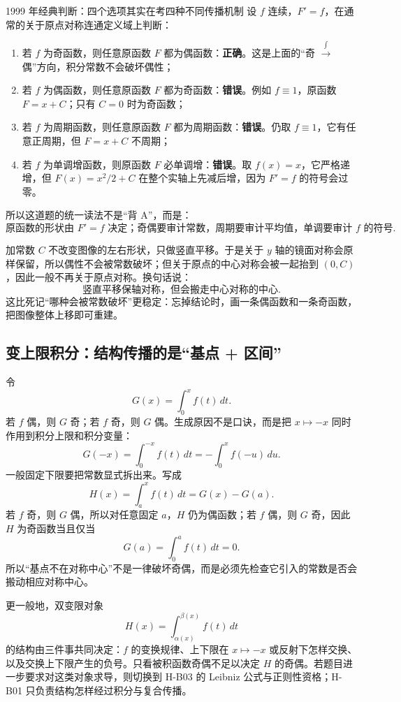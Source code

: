 \documentclass[11pt,a4paper]{ctexart}
\begin{document}
\begin{corebox}{1999 年经典判断：四个选项其实在考四种不同传播机制}
设 $f$ 连续，$F'=f$，在通常的关于原点对称连通定义域上判断：
\begin{enumerate}
\item 若 $f$ 为奇函数，则任意原函数 $F$ 都为偶函数：\textbf{正确}。这是上面的“奇 $\xrightarrow{\int}$ 偶”方向，积分常数不会破坏偶性；
\item 若 $f$ 为偶函数，则任意原函数 $F$ 都为奇函数：\textbf{错误}。例如 $f\equiv1$，原函数 $F=x+C$；只有 $C=0$ 时为奇函数；
\item 若 $f$ 为周期函数，则任意原函数 $F$ 都为周期函数：\textbf{错误}。仍取 $f\equiv1$，它有任意正周期，但 $F=x+C$ 不周期；
\item 若 $f$ 为单调增函数，则原函数 $F$ 必单调增：\textbf{错误}。取 $f(x)=x$，它严格递增，但 $F(x)=x^2/2+C$ 在整个实轴上先减后增，因为 $F'=f$ 的符号会过零。
\end{enumerate}

所以这道题的统一读法不是“背 A”，而是：
\[
\boxed{\text{原函数的形状由 }F'=f\text{ 决定；奇偶要审计常数，周期要审计平均值，单调要审计 }f\text{ 的符号}.}
\]
\end{corebox}

\begin{tcolorbox}[title=直觉锚点：积分常数只是把整张图上下平移]
加常数 $C$ 不改变图像的左右形状，只做竖直平移。于是关于 $y$ 轴的镜面对称会原样保留，所以偶性不会被常数破坏；但关于原点的中心对称会被一起抬到 $(0,C)$，因此一般不再关于原点对称。换句话说：
\[
\boxed{\text{竖直平移保轴对称，但会搬走中心对称的中心}.}
\]
这比死记“哪种会被常数破坏”更稳定：忘掉结论时，画一条偶函数和一条奇函数，把图像整体上移即可重建。
\end{tcolorbox}

\subsection{变上限积分：结构传播的是“基点 + 区间”}
令
\[
G(x)=\int_0^x f(t)\,dt.
\]
若 $f$ 偶，则 $G$ 奇；若 $f$ 奇，则 $G$ 偶。生成原因不是口诀，而是把 $x\mapsto -x$ 同时作用到积分上限和积分变量：
\[
G(-x)=\int_0^{-x}f(t)\,dt=-\int_0^x f(-u)\,du.
\]
一般固定下限要把常数显式拆出来。写成
\[
H(x)=\int_a^x f(t)\,dt=G(x)-G(a).
\]
若 $f$ 奇，则 $G$ 偶，所以对任意固定 $a$，$H$ 仍为偶函数；若 $f$ 偶，则 $G$ 奇，因此 $H$ 为奇函数当且仅当
\[
G(a)=\int_0^a f(t)\,dt=0.
\]
所以“基点不在对称中心”不是一律破坏奇偶，而是必须先检查它引入的常数是否会搬动相应对称中心。

更一般地，双变限对象
\[
H(x)=\int_{\alpha(x)}^{\beta(x)}f(t)\,dt
\]
的结构由三件事共同决定：$f$ 的变换规律、上下限在 $x\mapsto -x$ 或反射下怎样交换、以及交换上下限产生的负号。只看被积函数奇偶不足以决定 $H$ 的奇偶。若题目进一步要求对这类对象求导，则切换到 H-B03 的 Leibniz 公式与正则性资格；H-B01 只负责结构怎样经过积分与复合传播。
\end{document}
